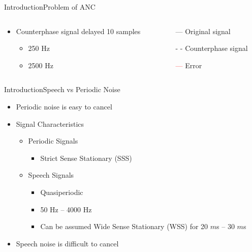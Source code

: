 \begin{frame}{Introduction}{Problem of ANC}		
	\begin{columns}
		\begin{column}{0.5\textwidth}
			\begin{itemize}
				\item Counterphase signal delayed 10 samples	
				\begin{itemize}
					\item 250 Hz
					\item 2500 Hz 
				\end{itemize}	
			\end{itemize}
			\vspace{-6.5mm}			
		\begin{center}
	 		
	 	\end{center}
		\end{column}
		\begin{column}{0.5\textwidth} 
		\begin{itemize}
			\item[\textcolor{MATLABblue}{---}] Original signal
			\item[\textcolor{MATLABblue}{- -}] Counterphase signal
			\item[\textcolor{red}{---}] Error
		\end{itemize}
		\begin{center}
	 		
	 	\end{center}
		\end{column}
	\end{columns}
\end{frame}





\begin{frame}{Introduction}{Speech vs Periodic Noise}		
	\begin{itemize}
		\item Periodic noise is easy to cancel
		\item Signal Characteristics
		\begin{itemize}
			\item Periodic Signals
			\begin{itemize}
				\item Strict Sense Stationary (SSS)
			\end{itemize}
			\item Speech Signals
			\begin{itemize}
				\item Quasiperiodic
				\item 50 Hz -- 4000 Hz
				\item Can be assumed Wide Sense Stationary (WSS) for 20 $m$s -- 30 $m$s 
			\end{itemize}
		\end{itemize}
		\item Speech noise is difficult to cancel
	\end{itemize}
\end{frame}




